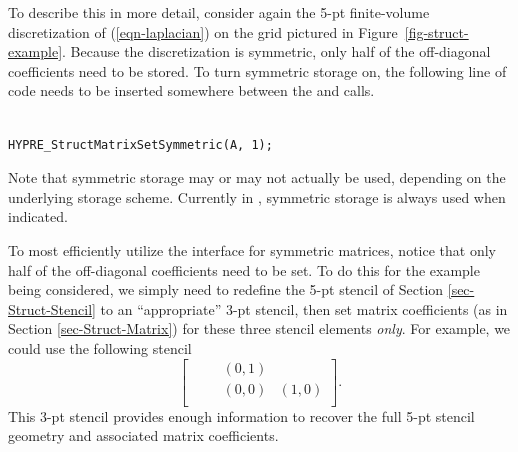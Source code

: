To describe this in more detail, consider again the 5-pt finite-volume
discretization of (\ref{eqn-laplacian}) on the grid pictured in
Figure~\ref{fig-struct-example}.  Because the discretization is symmetric, only
half of the off-diagonal coefficients need to be stored.  To turn symmetric
storage on, the following line of code needs to be inserted somewhere between
the  and  calls.
\begin{display}
\begin{verbatim}

HYPRE_StructMatrixSetSymmetric(A, 1);

\end{verbatim}
\end{display}
Note that symmetric storage may or may not actually be used, depending
on the underlying storage scheme.  Currently in \hypre{}, symmetric
storage is always used when indicated.

To most efficiently utilize the  interface for symmetric
matrices, notice that only half of the off-diagonal coefficients need
to be set.  To do this for the example being considered, we simply
need to redefine the 5-pt stencil of Section
\ref{sec-Struct-Stencil} to an ``appropriate'' 3-pt stencil, then
set matrix coefficients (as in Section \ref{sec-Struct-Matrix})
for these three stencil elements {\em only}.  For example, we could
use the following stencil
\begin{equation}\label{eqn-symmetric-stencil}
\left [
\begin{array}{ccc}
~~~~~~ & ( 0, 1) &         \\
~~~~~~ & ( 0, 0) & ( 1, 0) \\
~~~~~~ &         &        
\end{array}
\right ] .
\end{equation}
This 3-pt stencil provides enough information to recover the full 5-pt
stencil geometry and associated matrix coefficients.
